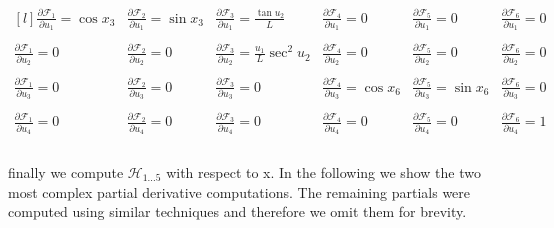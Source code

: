 \documentclass[paper=a4, fontsize=11pt]{scrartcl} %
\numberwithin{equation}{section} %
\numberwithin{figure}{section} %
\numberwithin{table}{section} %
\begin{document}
\begin{framed}
\[ \begin{matrix*}[l]
\frac{\partial\mathcal{F}_1}{\partial u_1} = \cos{x_3} &
\frac{\partial\mathcal{F}_2}{\partial u_1} = \sin{x_3} & 
\frac{\partial\mathcal{F}_3}{\partial u_1} = \frac{\tan{u_2}}{L} & 
\frac{\partial\mathcal{F}_4}{\partial u_1} = 0 & 
\frac{\partial\mathcal{F}_5}{\partial u_1} = 0 &  
\frac{\partial\mathcal{F}_6}{\partial u_1} = 0 & \\ \\
\frac{\partial\mathcal{F}_1}{\partial u_2} = 0 &
\frac{\partial\mathcal{F}_2}{\partial u_2} = 0 & 
\frac{\partial\mathcal{F}_3}{\partial u_2} = \frac{u_1}{L}\sec^2{u_2} & 
\frac{\partial\mathcal{F}_4}{\partial u_2} = 0 & 
\frac{\partial\mathcal{F}_5}{\partial u_2} = 0 &  
\frac{\partial\mathcal{F}_6}{\partial u_2} = 0 & \\ \\
\frac{\partial\mathcal{F}_1}{\partial u_3} = 0 &
\frac{\partial\mathcal{F}_2}{\partial u_3} = 0 & 
\frac{\partial\mathcal{F}_3}{\partial u_3} = 0 & 
\frac{\partial\mathcal{F}_4}{\partial u_3} = \cos{x_6} & 
\frac{\partial\mathcal{F}_5}{\partial u_3} = \sin{x_6} &  
\frac{\partial\mathcal{F}_6}{\partial u_3} = 0 & \\ \\
\frac{\partial\mathcal{F}_1}{\partial u_4} = 0 &
\frac{\partial\mathcal{F}_2}{\partial u_4} = 0 & 
\frac{\partial\mathcal{F}_3}{\partial u_4} = 0 & 
\frac{\partial\mathcal{F}_4}{\partial u_4} = 0 & 
\frac{\partial\mathcal{F}_5}{\partial u_4} = 0 &  
\frac{\partial\mathcal{F}_6}{\partial u_4} = 1 & \\ \\
\end{matrix*}\]

finally we compute $\mathcal{H}_{1 \dots 5}$ with respect to x.  In the following we show the two most complex partial derivative computations. The remaining partials were computed using similar techniques and therefore we omit them for brevity.  


\end{framed}
\end{document}
